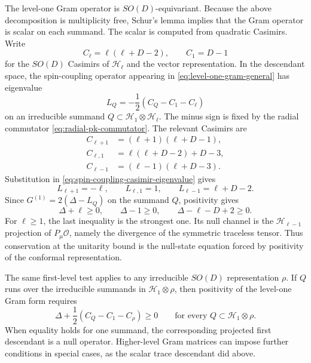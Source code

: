 The level-one Gram operator is \(SO(D)\)-equivariant.  Because the above
decomposition is multiplicity free, Schur's lemma implies that the Gram
operator is scalar on each summand.  The scalar is computed from quadratic
Casimirs.  Write
\[
  C_\ell=\ell(\ell+D-2),
  \qquad
  C_1=D-1
\]
for the \(SO(D)\) Casimirs of \(\mathcal H_\ell\) and the vector
representation.  In the descendant space, the spin-coupling operator appearing
in \eqref{eq:level-one-gram-general} has eigenvalue
\begin{equation}
  L_Q
  =
  -\frac12\left(C_Q-C_1-C_\ell\right)
  \label{eq:spin-coupling-casimir-eigenvalue}
\end{equation}
on an irreducible summand \(Q\subset\mathcal H_1\otimes\mathcal H_\ell\).  The
minus sign is fixed by the radial commutator
\eqref{eq:radial-pk-commutator}.  The relevant Casimirs are
\begin{align}
  C_{\ell+1}
  &=
  (\ell+1)(\ell+D-1),\\
  C_{\ell,1}
  &=
  \ell(\ell+D-2)+D-3,\\
  C_{\ell-1}
  &=
  (\ell-1)(\ell+D-3).
\end{align}
Substitution in \eqref{eq:spin-coupling-casimir-eigenvalue} gives
\[
  L_{\ell+1}=-\ell,
  \qquad
  L_{\ell,1}=1,
  \qquad
  L_{\ell-1}=\ell+D-2.
\]
Since \(G^{(1)}=2(\Delta-L_Q)\) on the summand \(Q\), positivity gives
\begin{equation}
  \Delta+\ell\ge0,
  \qquad
  \Delta-1\ge0,
  \qquad
  \Delta-\ell-D+2\ge0.
  \label{eq:spin-level-one-three-inequalities}
\end{equation}
For \(\ell\ge1\), the last inequality is the strongest one.  Its null channel
is the \(\mathcal H_{\ell-1}\) projection of \(P_\mu\mathcal O\), namely the
divergence of the symmetric traceless tensor.  Thus conservation at the
unitarity bound is the null-state equation forced by positivity of the
conformal representation.

The same first-level test applies to any irreducible \(SO(D)\) representation
\(\rho\).  If \(Q\) runs over the irreducible summands in
\(\mathcal H_1\otimes\rho\), then positivity of the level-one Gram form
requires
\begin{equation}
  \Delta+\frac12\left(C_Q-C_1-C_\rho\right)\ge0
  \qquad
  \text{for every }Q\subset\mathcal H_1\otimes\rho .
  \label{eq:general-level-one-unitarity-test}
\end{equation}
When equality holds for one summand, the corresponding projected first
descendant is a null operator.  Higher-level Gram matrices can impose further
conditions in special cases, as the scalar trace descendant did above.

